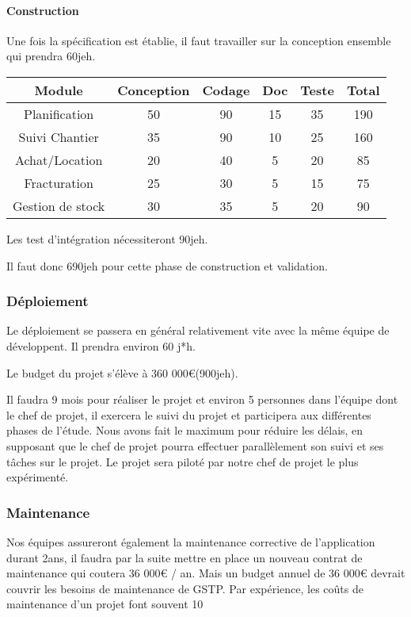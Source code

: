         \paragraph{Construction}
        Une fois la spécification est établie, il faut travailler sur la conception ensemble qui prendra 60jeh. 

    \begin{center} 
        \begin{tabular}{ |c| c| c | c | c |c |}
        \hline
	    Module&Conception&Codage&Doc&Teste&Total\\ \hline
        Planification & 50 & 90 & 15 &35&190\\ \hline
        Suivi Chantier &35&90&10&25&160 \\ \hline
        Achat/Location &20&40&5&20&85  \\ \hline
        Fracturation &25&30&5&15&75\\ \hline
        Gestion de stock &30&35&5&20&90 \\
        \hline
        \end{tabular}
    \end{center}

    Les test d'intégration nécessiteront 90jeh.

    Il faut donc 690jeh pour cette phase de construction et validation.

    \subsubsection{Déploiement}

    Le déploiement se passera en général relativement vite avec la même équipe de développent. Il prendra environ 60 j*h.

    Le budget du projet s'élève à 360 000€(900jeh).

    Il faudra 9 mois pour réaliser le projet et environ 5 personnes dans l'équipe dont le chef de projet, il exercera le suivi du projet et participera aux différentes phases de l'étude. Nous avons fait le maximum pour réduire les délais, en supposant que le chef de projet pourra effectuer parallèlement son suivi et ses tâches sur le projet. Le projet sera piloté par notre chef de projet le plus expérimenté.

    \subsubsection{Maintenance}

    Nos équipes assureront également la maintenance corrective de l'application durant 2ans, il faudra par la suite mettre en place un nouveau contrat de maintenance qui coutera 36 000€ / an. Mais un budget annuel de 36 000€ devrait couvrir les besoins de maintenance de GSTP. Par expérience, les coûts de maintenance d'un projet font souvent 10%

